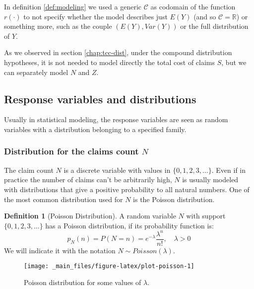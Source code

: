 \documentclass[a4paper, nobind]{templates/ociamthesis}
\theoremstyle{definition}
\newtheorem{definition}{Definition}[chapter]
\theoremstyle{definition}
\theoremstyle{definition}
\theoremstyle{remark}
\begin{document}
In definition \ref{def:modeling} we used a generic \(\mathcal{C}\) as codomain of the function \(r(\cdot)\) to not specify whether the model describes just \(E(Y)\) (and so \(\mathcal{C}=\mathbb{R}\)) or something more, such as the couple \(\left( E(Y), Var(Y) \right)\) or the full distribution of \(Y\).

As we observed in section \ref{chap:tcc-dist}, under the compound distribution hypotheses, it is not needed to model directly the total cost of claims \(S\), but we can separately model \(N\) and \(Z\).

\hypertarget{response-variables-and-distributions}{%
\subsection{Response variables and distributions}\label{response-variables-and-distributions}}

Usually in statistical modeling, the response variables are seen as random variables with a distribution belonging to a specified family.

\hypertarget{chap:dist-n}{%
\subsubsection{\texorpdfstring{Distribution for the claims count \(N\)}{Distribution for the claims count N}}\label{chap:dist-n}}

The claim count \(N\) is a discrete variable with values in \(\{0, 1, 2, 3,\dots\}\). Even if in practice the number of claims can't be arbitrarily high, \(N\) is usually modeled with distributions that give a positive probability to all natural numbers. One of the most common distribution used for \(N\) is the Poisson distribution.

\begin{definition}[Poisson Distribution]
\label{def:def-poisson} \iffalse (Poisson Distribution) \fi{} A random variable \(N\) with support \(\{0,1,2,3,\dots \}\) has a Poisson distribution, if its probability function is:
\[
p_N(n) = P\left( N = n \right) = e^{-\lambda}\frac{\lambda^n}{n!}, \quad \lambda>0
\]
We will indicate it with the notation \(N \sim Poisson(\lambda)\).
\end{definition}

\begin{figure}[!hbtp]

{\centering \texttt{[image: \_main\_files/figure-latex/plot-poisson-1]} 

}

\caption{Poisson distribution for some values of $\lambda$.}\label{fig:plot-poisson}
\end{figure}
\end{document}
